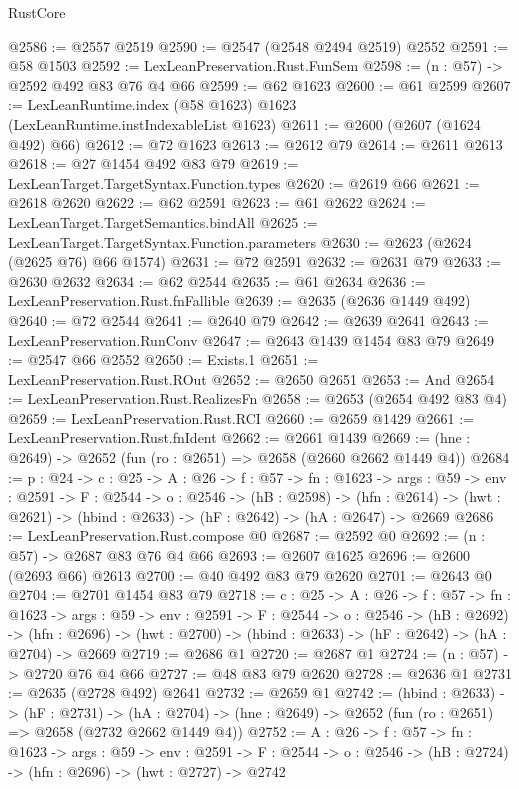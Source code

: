 \begin{lexlean}{RustCore}
\begin{coremodule}
@2586 := @2557 @2519
@2590 := @2547 (@2548 @2494 @2519) @2552
@2591 := @58 @1503
@2592 := LexLeanPreservation.Rust.FunSem
@2598 := (n : @57) -> @2592 @492 @83 @76 @4 @66
@2599 := @62 @1623
@2600 := @61 @2599
@2607 := LexLeanRuntime.index (@58 @1623) @1623 (LexLeanRuntime.instIndexableList @1623)
@2611 := @2600 (@2607 (@1624 @492) @66)
@2612 := @72 @1623
@2613 := @2612 @79
@2614 := @2611 @2613
@2618 := @27 @1454 @492 @83 @79
@2619 := LexLeanTarget.TargetSyntax.Function.types
@2620 := @2619 @66
@2621 := @2618 @2620
@2622 := @62 @2591
@2623 := @61 @2622
@2624 := LexLeanTarget.TargetSemantics.bindAll
@2625 := LexLeanTarget.TargetSyntax.Function.parameters
@2630 := @2623 (@2624 (@2625 @76) @66 @1574)
@2631 := @72 @2591
@2632 := @2631 @79
@2633 := @2630 @2632
@2634 := @62 @2544
@2635 := @61 @2634
@2636 := LexLeanPreservation.Rust.fnFallible
@2639 := @2635 (@2636 @1449 @492)
@2640 := @72 @2544
@2641 := @2640 @79
@2642 := @2639 @2641
@2643 := LexLeanPreservation.RunConv
@2647 := @2643 @1439 @1454 @83 @79
@2649 := @2547 @66 @2552
@2650 := Exists.{1}
@2651 := LexLeanPreservation.Rust.ROut
@2652 := @2650 @2651
@2653 := And
@2654 := LexLeanPreservation.Rust.RealizesFn
@2658 := @2653 (@2654 @492 @83 @4)
@2659 := LexLeanPreservation.Rust.RCI
@2660 := @2659 @1429
@2661 := LexLeanPreservation.Rust.fnIdent
@2662 := @2661 @1439
@2669 := (hne : @2649) -> @2652 (fun (ro : @2651) => @2658 (@2660 @2662 @1449 @4))
@2684 := {p : @24} ->
  {c : @25} ->
  {A : @26} ->
  {f : @57} ->
  {fn : @1623} ->
  {args : @59} ->
  {env : @2591} ->
  {F : @2544} ->
  {o : @2546} ->
  (hB : @2598) ->
  (hfn : @2614) -> (hwt : @2621) -> (hbind : @2633) -> (hF : @2642) -> (hA : @2647) -> @2669
@2686 := LexLeanPreservation.Rust.compose @0
@2687 := @2592 @0
@2692 := (n : @57) -> @2687 @83 @76 @4 @66
@2693 := @2607 @1625
@2696 := @2600 (@2693 @66) @2613
@2700 := @40 @492 @83 @79 @2620
@2701 := @2643 @0
@2704 := @2701 @1454 @83 @79
@2718 := {c : @25} ->
  {A : @26} ->
  {f : @57} ->
  {fn : @1623} ->
  {args : @59} ->
  {env : @2591} ->
  {F : @2544} ->
  {o : @2546} ->
  (hB : @2692) ->
  (hfn : @2696) -> (hwt : @2700) -> (hbind : @2633) -> (hF : @2642) -> (hA : @2704) -> @2669
@2719 := @2686 @1
@2720 := @2687 @1
@2724 := (n : @57) -> @2720 @76 @4 @66
@2727 := @48 @83 @79 @2620
@2728 := @2636 @1
@2731 := @2635 (@2728 @492) @2641
@2732 := @2659 @1
@2742 := (hbind : @2633) ->
  (hF : @2731) ->
  (hA : @2704) -> (hne : @2649) -> @2652 (fun (ro : @2651) => @2658 (@2732 @2662 @1449 @4))
@2752 := {A : @26} ->
  {f : @57} ->
  {fn : @1623} ->
  {args : @59} ->
  {env : @2591} ->
  {F : @2544} -> {o : @2546} -> (hB : @2724) -> (hfn : @2696) -> (hwt : @2727) -> @2742

\end{coremodule}
\end{lexlean}
